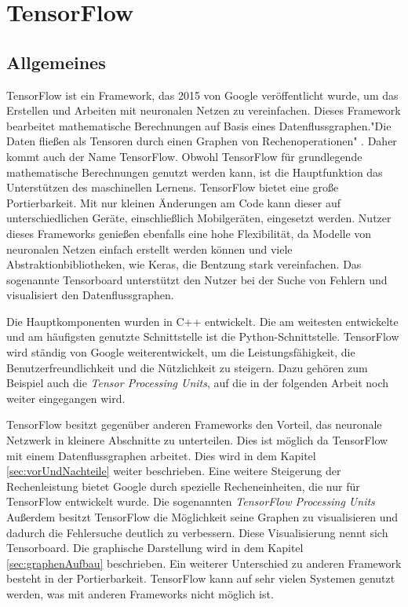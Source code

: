 \chapter{TensorFlow}
\label{chap:tensorflow}
\section{Allgemeines}
\label{sec:allgemeines}
\printsubchapterauthor{\authorNiklas}
TensorFlow ist ein Framework, das 2015 von Google veröffentlicht wurde, um das Erstellen und Arbeiten mit neuronalen Netzen zu vereinfachen. Dieses Framework bearbeitet mathematische Berechnungen auf Basis eines Datenflussgraphen."Die Daten fließen als Tensoren durch einen Graphen von Rechenoperationen" \citep{Einfuehrung}. Daher kommt auch der Name TensorFlow. Obwohl TensorFlow für grundlegende mathematische Berechnungen genutzt werden kann, ist die Hauptfunktion das Unterstützen des maschinellen Lernens. TensorFlow bietet eine große Portierbarkeit. Mit nur kleinen Änderungen am Code kann dieser auf unterschiedlichen Geräte, einschließlich Mobilgeräten, eingesetzt werden. Nutzer dieses Frameworks genießen ebenfalls eine hohe Flexibilität, da Modelle von neuronalen Netzen einfach erstellt werden können und viele Abstraktionbibliotheken, wie Keras, die Bentzung stark vereinfachen. Das sogenannte Tensorboard unterstützt den Nutzer bei der Suche von Fehlern und visualisiert den Datenflussgraphen. \cite{Einfuehrung} 

Die Hauptkomponenten wurden in C++ entwickelt. Die am weitesten entwickelte und am häufigsten genutzte Schnittstelle ist die Python-Schnittstelle. TensorFlow wird ständig von Google weiterentwickelt, um die Leistungsfähigkeit, die Benutzerfreundlichkeit und die Nützlichkeit zu steigern. Dazu gehören zum Beispiel auch die \textit{Tensor Processing Units}, auf die in der folgenden Arbeit noch weiter eingegangen wird.

TensorFlow besitzt gegenüber anderen Frameworks den Vorteil, das neuronale Netzwerk in kleinere Abschnitte zu unterteilen. Dies ist möglich da TensorFlow mit einem Datenflussgraphen arbeitet. Dies wird in dem Kapitel \ref{sec:vorUndNachteile} weiter beschrieben. Eine weitere Steigerung der Rechenleistung bietet Google durch spezielle Recheneinheiten, die nur für TensorFlow entwickelt wurde. Die sogenannten \textit{TensorFlow Processing Units} Außerdem besitzt TensorFlow die Möglichkeit seine Graphen zu visualisieren und dadurch die Fehlersuche deutlich zu verbessern. Diese Visualisierung nennt sich Tensorboard. Die graphische Darstellung wird in dem Kapitel \ref{sec:graphenAufbau} beschrieben. Ein weiterer Unterschied zu anderen Framework besteht in der Portierbarkeit. TensorFlow kann auf sehr vielen Systemen genutzt werden, was mit anderen Frameworks nicht möglich ist.
